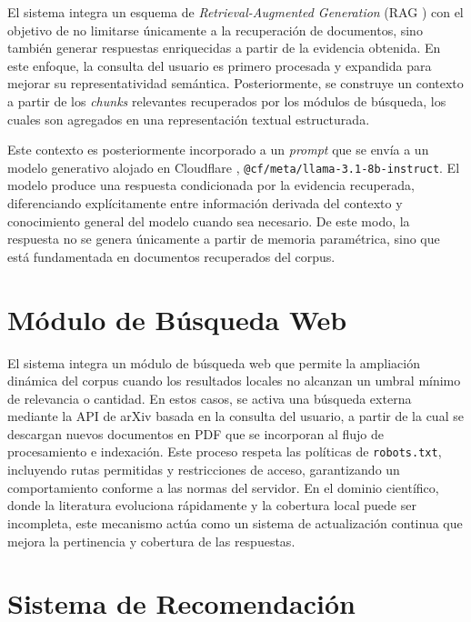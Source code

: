 \documentclass[runningheads]{llncs}
\begin{document}
El sistema integra un esquema de \textit{Retrieval-Augmented Generation} (RAG \cite{rag}) con el objetivo de no limitarse únicamente a 
la recuperación de documentos, sino también generar respuestas enriquecidas a partir de la evidencia obtenida. 
En este enfoque, la consulta del usuario es primero procesada y expandida para mejorar su representatividad semántica. 
Posteriormente, se construye un contexto a partir de los \textit{chunks} relevantes recuperados por los módulos de búsqueda, 
los cuales son agregados en una representación textual estructurada.

Este contexto es posteriormente incorporado a un \textit{prompt} 
que se envía a un modelo generativo alojado en Cloudflare \cite{cloudflare}, 
\texttt{@cf/meta/llama-3.1-8b-instruct}. 
El modelo produce una respuesta condicionada por la evidencia recuperada, 
diferenciando explícitamente entre información derivada del contexto y conocimiento general del modelo cuando sea necesario. 
De este modo, la respuesta no se genera únicamente a partir de memoria paramétrica, 
sino que está fundamentada en documentos recuperados del corpus.

\section{Módulo de Búsqueda Web}

El sistema integra un módulo de búsqueda web que permite la ampliación dinámica del corpus cuando los resultados locales no alcanzan un umbral mínimo 
de relevancia o cantidad. 
En estos casos, se activa una búsqueda externa mediante la API de arXiv basada en la consulta del usuario, 
a partir de la cual se descargan nuevos documentos en PDF que se incorporan al flujo de procesamiento e indexación. 
Este proceso respeta las políticas de \texttt{robots.txt}, incluyendo rutas permitidas y restricciones de acceso, 
garantizando un comportamiento conforme a las normas del servidor. 
En el dominio científico, donde la literatura evoluciona rápidamente y la cobertura local puede ser incompleta, este mecanismo actúa como un sistema de 
actualización continua que mejora la pertinencia y cobertura de las respuestas.

\section{Sistema de Recomendación}
\end{document}
